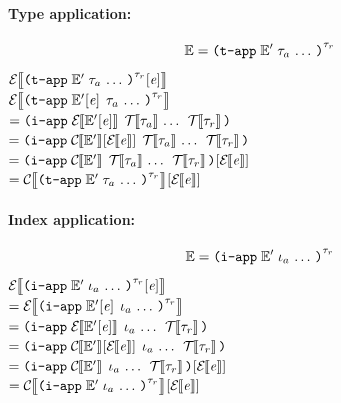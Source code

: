 \begin{sproof}
\paragraph{Type application:}
  \[\ctxt =
  \notedtapp[\type_r]
  {\ctxt'}
  {\sequence{\type_a}}\]
  $\EraseE{\fillc{\notedtapp[\type_r]
      {\ctxt'}
      {\sequence{\type_a}}}
    {\expr}}$ \\
  $\EraseE{\notedtapp[\type_r]
    {\fillc{\ctxt'}{\expr}}
    {\sequence{\type_a}}}$ \\
  $= \iapp
  {\EraseE{\fillc{\ctxt'}{\expr}}}
  {\sequence{\EraseT{\type_a}}\;\EraseT{\type_r}}$ \\
  $= \iapp
  {\fillc{\EraseC{\ctxt'}}{\EraseE{\expr}}}
  {\sequence{\EraseT{\type_a}}\;\EraseT{\type_r}}$ \\
  $= \fillc{\iapp
    {\EraseC{\ctxt'}}
    {\sequence{\EraseT{\type_a}}\;\EraseT{\type_r}}}
  {\EraseE{\expr}}$ \\
  $= \fillc{\EraseC{\notedtapp[\type_r]
      {\ctxt'}
      {\sequence{\type_a}}}}
  {\EraseE{\expr}}$ \\

\paragraph{Index application:}
  \[\ctxt =
  \notediapp[\type_r]
  {\ctxt'}
  {\sequence{\idx_a}}\]
  $\EraseE{\fillc
    {\notediapp[\type_r]
      {\ctxt'}
      {\sequence{\idx_a}}}
    {\expr}}$ \\
  $= \EraseE{\notediapp[\type_r]
    {\fillc{\ctxt'}{\expr}}
    {\sequence{\idx_a}}}$ \\
  $= \iapp
  {\EraseE{\fillc{\ctxt'}{\expr}}}
  {\sequence{\idx_a}\;\EraseT{\type_r}}$ \\
  $= \iapp
  {\fillc{\EraseC{\ctxt'}}{\EraseE{\expr}}}
  {\sequence{\idx_a}\;\EraseT{\type_r}}$ \\
  $= \fillc{\iapp
    {\EraseC{\ctxt'}}
    {\sequence{\idx_a}\;\EraseT{\type_r}}}
  {\EraseE{\expr}}$ \\
  $= \fillc{\EraseC{\notediapp[\type_r]
      {\ctxt'}
      {\sequence{\idx_a}}}}
  {\EraseE{\expr}}$ \\


\end{sproof}
